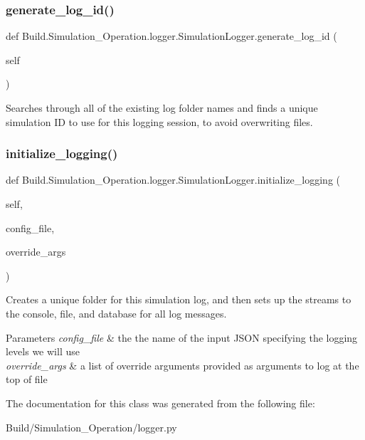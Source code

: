 \subsubsection{\texorpdfstring{generate\+\_\+log\+\_\+id()}{generate\_log\_id()}}
{\footnotesize\ttfamily def Build.\+Simulation\+\_\+\+Operation.\+logger.\+Simulation\+Logger.\+generate\+\_\+log\+\_\+id (\begin{DoxyParamCaption}\item[{}]{self }\end{DoxyParamCaption})}



Searches through all of the existing log folder names and finds a unique simulation ID to use for this logging session, to avoid overwriting files. 

\mbox{\label{class_build_1_1_simulation___operation_1_1logger_1_1_simulation_logger_a4eeb0628ec65481e5c3c625c85723b80}} 
\subsubsection{\texorpdfstring{initialize\+\_\+logging()}{initialize\_logging()}}
{\footnotesize\ttfamily def Build.\+Simulation\+\_\+\+Operation.\+logger.\+Simulation\+Logger.\+initialize\+\_\+logging (\begin{DoxyParamCaption}\item[{}]{self,  }\item[{}]{config\+\_\+file,  }\item[{}]{override\+\_\+args }\end{DoxyParamCaption})}



Creates a unique folder for this simulation log, and then sets up the streams to the console, file, and database for all log messages. 


\begin{DoxyParams}{Parameters}
{\em config\+\_\+file} & the the name of the input J\+S\+ON specifying the logging levels we will use \\
\hline
{\em override\+\_\+args} & a list of override arguments provided as arguments to log at the top of file \\
\hline
\end{DoxyParams}


The documentation for this class was generated from the following file\+:\begin{DoxyCompactItemize}
\item 
Build/\+Simulation\+\_\+\+Operation/logger.\+py\end{DoxyCompactItemize}
